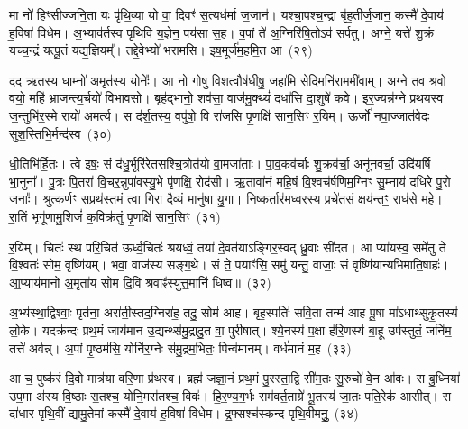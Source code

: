 {\anuvakamend[{रपः॑ पत॒त्रिणी॒र्या अꣳह॑सो॒ याः खना॑मि वो॒\-ऽष्टाद॑श च}]}

मा नो॑ हिꣳसीज्जनि॒ता यः पृ॑थि॒व्या यो वा॒ दिवꣳ॑ स॒त्यध॑र्मा ज॒जान॑। यश्चा॒पश्च॒न्द्रा बृ॑ह॒तीर्ज॒जान॒ कस्मै॑ दे॒वाय॑ ह॒विषा॑ विधेम। अ॒भ्याव॑र्तस्व पृथिवि य॒ज्ञेन॒ पय॑सा स॒ह। व॒पां ते॑ अ॒ग्निरि॑षि॒तो\-ऽव॑ सर्पतु। अग्ने॒ यत्ते॑ शु॒क्रं यच्च॒न्द्रं यत्पू॒तं यद्य॒ज्ञियम्᳚। तद्दे॒वेभ्यो॑ भरामसि। इष॒मूर्ज॑म॒हमि॒त आ~(२९)\ip

द॑द ऋ॒तस्य॒ धाम्नो॑ अ॒मृत॑स्य॒ योनेः᳚। आ नो॒ गोषु॑ विश॒त्वौष॑धीषु॒ जहा॑मि से॒दिमनि॑रा॒ममी॑वाम्। अग्ने॒ तव॒ श्रवो॒ वयो॒ महि॑ भ्राजन्त्य॒र्चयो॑ विभावसो। बृह॑द्भानो॒ शव॑सा॒ वाज॑मु॒क्थ्यं॑ दधा॑सि दा॒शुषे॑ कवे। इ॒र॒ज्यन्न॑ग्ने प्रथयस्व ज॒न्तुभि॑र॒स्मे रायो॑ अमर्त्य। स द॑र्\mbox{}श॒तस्य॒ वपु॑षो॒ वि रा॑जसि पृ॒णक्षि॑ सान॒सिꣳ र॒यिम्। ऊर्जो॑ नपा॒ज्जात॑वेदः सुश॒स्तिभि॒र्मन्द॑स्व~(३०)\ip

धी॒तिभि॑र्हि॒तः। त्वे इषः॒ सं द॑धु॒र्भूरि॑रेतसश्चि॒त्रोत॑यो वा॒मजा॑ताः। पा॒व॒कव॑र्चाः शु॒क्रव॑र्चा॒ अनू॑नवर्चा॒ उदि॑यर्\mbox{}षि भा॒नुना᳚। पु॒त्रः पि॒तरा॑ वि॒चर॒न्नुपा॑वस्यु॒भे पृ॑णक्षि॒ रोद॑सी। ऋ॒तावा॑नं महि॒षं वि॒श्वच॑र्\mbox{}षणिम॒ग्निꣳ सु॒म्नाय॑ दधिरे पु॒रो जनाः᳚। श्रुत्क॑र्णꣳ स॒प्रथ॑स्तमं त्वा गि॒रा दैव्यं॒ मानु॑षा यु॒गा। नि॒ष्क॒र्तार॑मध्व॒रस्य॒ प्रचे॑तसं॒ क्षय॑न्त॒ꣳ॒ राध॑से म॒हे। रा॒तिं भृगू॑णामु॒शिजं॑ क॒विक्र॑तुं पृ॒णक्षि॑ सान॒सिꣳ~(३१)\ip

र॒यिम्। चितः॑ स्थ परि॒चित॑ ऊर्ध्व॒चितः॑ श्रयध्वं॒ तया॑ दे॒वत॑या\-ऽ\-ङ्गिर॒स्वद् ध्रु॒वाः सी॑दत। आ प्या॑यस्व॒ समे॑तु ते वि॒श्वतः॑ सोम॒ वृष्णि॑यम्। भवा॒ वाज॑स्य सङ्ग॒थे। सं ते॒ पयाꣳ॑सि॒ समु॑ यन्तु॒ वाजाः॒ सं वृष्णि॑यान्यभिमाति॒षाहः॑। आ॒प्याय॑मानो अ॒मृता॑य सोम दि॒वि श्रवाꣴ॑स्युत्त॒मानि॑ धिष्व॥~(३२)\ip

{\anuvakamend[{आ मन्द॑स्व सान॒सिमेका॒न्नच॑त्वारि॒ꣳ॒शच्च॑}]}

अ॒भ्य॑स्था॒द्विश्वाः॒ पृत॑ना॒ अरा॑ती॒स्तद॒ग्निरा॑ह॒ तदु॒ सोम॑ आह। बृह॒स्पतिः॑ सवि॒ता तन्म॑ आह पू॒षा मा॑\-ऽ\-धाथ्सुकृ॒तस्य॑ लो॒के। यदक्र॑न्दः प्रथ॒मं जाय॑मान उ॒द्यन्थ्स॑मु॒द्रादु॒त वा॒ पुरी॑षात्। श्ये॒नस्य॑ प॒क्षा ह॑रि॒णस्य॑ बा॒हू उप॑स्तुतं॒ जनि॑म॒ तत्ते॑ अर्वन्न्। अ॒पां पृ॒ष्ठम॑सि॒ योनि॑र॒ग्नेः स॑मु॒द्रम॒भितः॒ पिन्व॑मानम्। वर्ध॑मानं म॒ह~(३३)\ip

आ च॒ पुष्क॑रं दि॒वो मात्र॑या वरि॒णा प्र॑थस्व। ब्रह्म॑ जज्ञा॒नं प्र॑थ॒मं पु॒रस्ता॒द्वि सी॑म॒तः सु॒रुचो॑ वे॒न आ॑वः। स बु॒ध्निया॑ उप॒मा अ॑स्य वि॒ष्ठाः स॒तश्च॒ योनि॒मस॑तश्च॒ विवः॑। हि॒र॒ण्य॒ग॒र्भः सम॑वर्त॒ताग्रे॑ भू॒तस्य॑ जा॒तः पति॒रेक॑ आसीत्। स दा॑धार पृथि॒वीं द्यामु॒तेमां कस्मै॑ दे॒वाय॑ ह॒विषा॑ विधेम। द्र॒फ्सश्च॑स्कन्द पृथि॒वीमनुु॒~(३४)\ip

